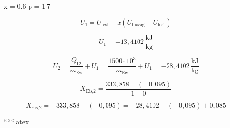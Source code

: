  \quad x = 0.6 \quad p = 1.7 \, 

\[
U_1 = U_{\text{fest}} + x (U_{\text{flüssig}} - U_{\text{fest}})
\]

\[
U_1 = -13,4102 \, \frac{\text{kJ}}{\text{kg}}
\]

\[
U_2 = \frac{Q_{12}}{m_{\text{Ew}}} + U_1 = \frac{1500 \cdot 10^3}{m_{\text{Ew}}} + U_1 = -28,4102 \, \frac{\text{kJ}}{\text{kg}}
\]


\[
X_{\text{Eis,2}} = \frac{333,858 - (-0,095)}{1 - 0}
\]

\[
X_{\text{Eis,2}} = -333,858 - (-0,095) = -28,4102 - (-0,095) + 0,085
\]

``````latex